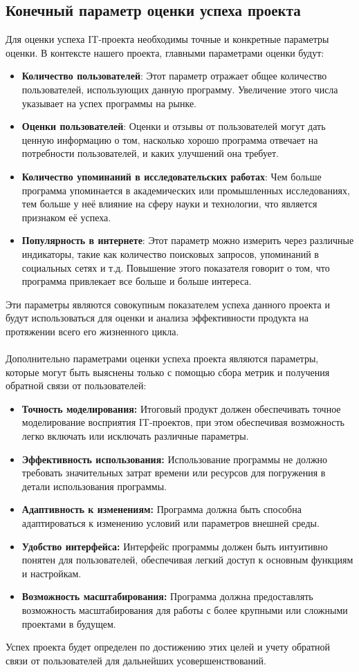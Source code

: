 \documentclass{article}
\begin{document}
    \subsection {Конечный параметр оценки успеха проекта}
    Для оценки успеха IT-проекта необходимы точные и конкретные параметры оценки. В контексте нашего проекта, главными параметрами оценки будут:
    \begin{itemize}
        \item \textbf{Количество пользователей}: Этот параметр отражает общее количество пользователей, использующих данную программу. Увеличение этого числа указывает на успех программы на рынке.
        \item \textbf{Оценки пользователей}: Оценки и отзывы от пользователей могут дать ценную информацию о том, насколько хорошо программа отвечает на потребности пользователей, и каких улучшений она требует.
        \item \textbf{Количество упоминаний в исследовательских работах}: Чем больше программа упоминается в академических или промышленных исследованиях, тем больше у неё влияние на сферу науки и технологии, что является признаком её успеха.
        \item \textbf{Популярность в интернете}: Этот параметр можно измерить через различные индикаторы, такие как количество поисковых запросов, упоминаний в социальных сетях и т.д. Повышение этого показателя говорит о том, что программа привлекает все больше и больше интереса.
    \end{itemize}
    Эти параметры являются совокупным показателем успеха данного проекта и будут использоваться для оценки и анализа эффективности продукта на протяжении всего его жизненного цикла.\\
    ~\\
    Дополнительно параметрами оценки успеха проекта являются параметры, которые могут быть выяснены только с помощью сбора метрик и получения обратной связи от пользователей:
    \begin{itemize}
        \item \textbf{Точность моделирования:} Итоговый продукт должен обеспечивать точное моделирование восприятия IT-проектов, при этом обеспечивая возможность легко включать или исключать различные параметры.
        \item \textbf{Эффективность использования:} Использование программы не должно требовать значительных затрат времени или ресурсов для погружения в детали использования программы.
        \item \textbf{Адаптивность к изменениям:} Программа должна быть способна адаптироваться к изменению условий или параметров внешней среды.
        \item \textbf{Удобство интерфейса:} Интерфейс программы должен быть интуитивно понятен для пользователей, обеспечивая легкий доступ к основным функциям и настройкам.
        \item \textbf{Возможность масштабирования:} Программа должна предоставлять возможность масштабирования для работы с более крупными или сложными проектами в будущем.
    \end{itemize}
    Успех проекта будет определен по достижению этих целей и учету обратной связи от пользователей для дальнейших усовершенствований.
\end{document}
